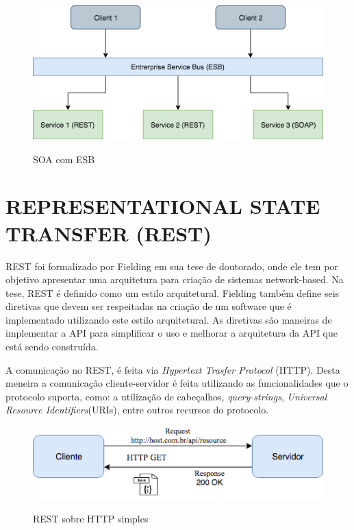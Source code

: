 \begin{figure}[!htb]
  \centering
  \caption{SOA com ESB}
  \includegraphics[width=1\textwidth]{./dados/figuras/SOA.png}
  \label{fig:soaesb}
\end{figure}

\section{REPRESENTATIONAL STATE TRANSFER (REST)}
REST foi formalizado por Fielding \cite{fielding} em sua tese de doutorado, onde ele tem por 
objetivo apresentar uma arquitetura para criação de sistemas network-based. 
Na tese, REST é definido como um estilo arquitetural. Fielding também define seis diretivas que 
devem ser respeitadas na criação de um software que é implementado utilizando este estilo arquitetural. 
As diretivas são maneiras de implementar a API para simplificar o uso e melhorar a 
arquitetura da API que está sendo construída. 

A comunicação no REST, é feita via \textit{Hypertext Trasfer Protocol} (HTTP). Desta meneira
a comunicação cliente-servidor é feita utilizando as funcionalidades que o protocolo suporta,
como: a utilização de cabeçalhos, \textit{query-strings}, \textit{Universal Resource Identifiers}(URIs),
entre outros recursos do protocolo.

\begin{figure}[!htb]
  \centering
  \caption{REST sobre HTTP simples}
  \includegraphics[width=1\textwidth]{./dados/figuras/rest-1.png}
  \label{fig:rest1}
\end{figure}

